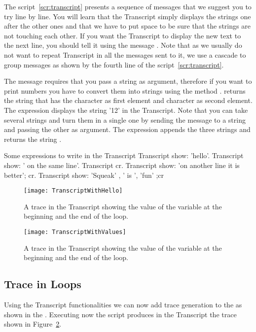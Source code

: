 The script~\ref{scr:transcript} presents a sequence of messages that we suggest you to try line by line. You will learn that the Transcript simply displays the strings one after the other ones and that we have to put space to be sure that the strings are not touching each other. If you want the Transcript to display the new text to the next line, you should tell it using the message . Note that as we usually do not want to repeat Transcript in all the messages sent to it, we use a cascade to group messages as shown by the fourth line of the script~\ref{scr:transcript}.

The message  requires that you pass a string as argument, therefore if you want to print numbers you have to convert them into strings using the method .  returns  the string
that has the character  as first element and character  as second element. The expression  displays the string '12' in the Transcript. Note that you can take several strings and turn them in a single one by sending the message \ct{,} to a string and passing the other as argument. The expression  appends the three strings and returns the string .

\begin{scriptwithtitle}{Some expressions to write in the Transcript}\label{scr:transcript}
Transcript show: 'hello'.
Transcript show: ' on the same line'.
Transcript cr.
Transcript show: 'on another line it is better'; cr.
Transcript show: 'Squeak' , ' is ', 'fun' ;cr
\end{scriptwithtitle}


\begin{figure}[!htbp]
\centerline{\texttt{[image: TranscriptWithHello]}}
\caption{A trace in the Transcript showing the value of the variable  at the beginning and the end of the loop.}
\label{fig:transcripthello}
\end{figure}


\begin{figure}[!htbp]
\centerline{\texttt{[image: TranscriptWithValues]}}
\caption{A trace in the Transcript showing the value of the variable  at the beginning and the end of the loop.}
\label{fig:transcriptvalue}
\end{figure}



\subsection{Trace in Loops}
Using the Transcript functionalities we can now add trace generation to the
 as shown in the . Executing now the script produces in the Transcript the trace shown in Figure~\ref{fig:transcriptvalue}.


